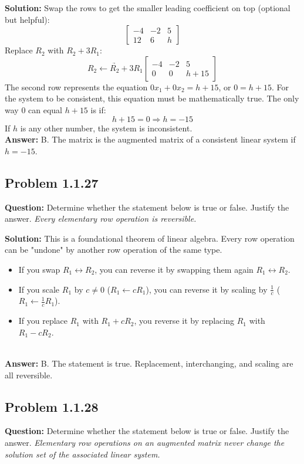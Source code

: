 \documentclass[11pt]{article}
\begin{document}
\textbf{Solution:}
Swap the rows to get the smaller leading coefficient on top (optional but helpful):
\[
\begin{bmatrix}
-4 & -2 & 5 \\
12 & 6 & h
\end{bmatrix}
\]
Replace $R_2$ with $R_2 + 3R_1$:
\[
\underrightarrow{R_2 \leftarrow R_2 + 3R_1}
\begin{bmatrix}
-4 & -2 & 5 \\
0 & 0 & h + 15
\end{bmatrix}
\]
The second row represents the equation $0x_1 + 0x_2 = h + 15$, or $0 = h + 15$.
For the system to be consistent, this equation must be mathematically true. The only way $0$ can equal $h + 15$ is if:
\[ h + 15 = 0 \Rightarrow h = -15 \]
If $h$ is any other number, the system is inconsistent.
\\
\textbf{Answer:} B. The matrix is the augmented matrix of a consistent linear system if $h = -15$.


\subsection*{Problem 1.1.27}
\textbf{Question:} Determine whether the statement below is true or false. Justify the answer.
\textit{Every elementary row operation is reversible.}

\textbf{Solution:}
This is a foundational theorem of linear algebra. Every row operation can be "undone" by another row operation of the same type.
\begin{itemize}
    \item If you swap $R_1 \leftrightarrow R_2$, you can reverse it by swapping them again $R_1 \leftrightarrow R_2$.
    \item If you scale $R_1$ by $c \neq 0$ ($R_1 \leftarrow cR_1$), you can reverse it by scaling by $\frac{1}{c}$ ($R_1 \leftarrow \frac{1}{c}R_1$).
    \item If you replace $R_1$ with $R_1 + cR_2$, you reverse it by replacing $R_1$ with $R_1 - cR_2$.
\end{itemize}
\\
\textbf{Answer:} B. The statement is true. Replacement, interchanging, and scaling are all reversible.


\subsection*{Problem 1.1.28}
\textbf{Question:} Determine whether the statement below is true or false. Justify the answer.
\textit{Elementary row operations on an augmented matrix never change the solution set of the associated linear system.}
\end{document}
